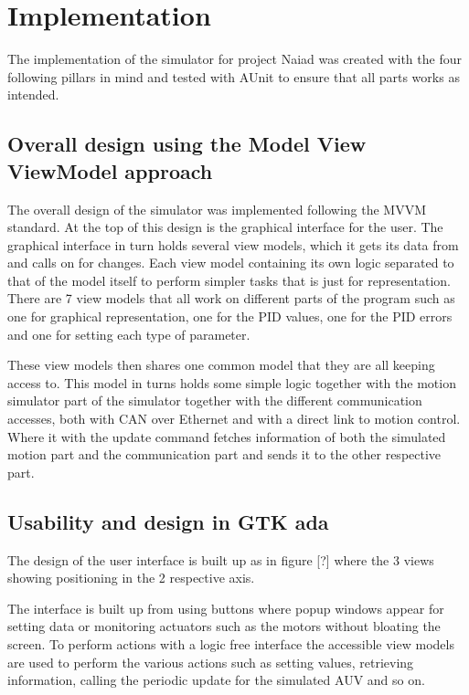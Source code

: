 \section{Implementation}\label{sec:implementation}
The implementation of the simulator for project Naiad was created with the four following pillars in mind and tested with AUnit to ensure that all parts works as intended.

\subsection{Overall design using the Model View ViewModel approach}

The overall design of the simulator was implemented following the MVVM standard. At the top of this design is the graphical interface for the user. The graphical interface in turn holds several view models, which it gets its data from and calls on for changes. Each view model containing its own logic separated to that of the model itself to perform simpler tasks that is just for representation. There are 7 view models that all work on different parts of the program such as one for graphical representation, one for the PID values, one for the PID errors and one for setting each type of parameter.

These view models then shares one common model that they are all keeping access to. This model in turns holds some simple logic together with the motion simulator part of the simulator together with the different communication accesses, both with CAN over Ethernet and with a direct link to motion control. Where it with the update command fetches information of both the simulated motion part and the communication part and sends it to the other respective part.

\subsection{Usability and design in GTK ada}
The design of the user interface is built up as in figure [?] where the 3 views showing positioning in the 2 respective axis.

The interface is built up from using buttons where popup windows appear for setting data or monitoring actuators such as the motors without bloating the screen. To perform actions with a logic free interface the accessible view models are used to perform the various actions such as setting values, retrieving information, calling the periodic update for the simulated AUV and so on.

